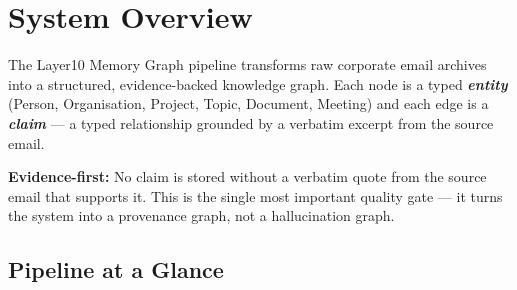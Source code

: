 \documentclass[11pt,a4paper]{article}
\newcommand{\term}[1]{\textbf{\textit{#1}}}
\begin{document}
\tableofcontents
\newpage

\section{System Overview}

The Layer10 Memory Graph pipeline transforms raw corporate email archives into a
structured, evidence-backed knowledge graph.  Each node is a typed \term{entity}
(Person, Organisation, Project, Topic, Document, Meeting) and each edge is a
\term{claim} — a typed relationship grounded by a verbatim excerpt from the
source email.

\begin{tcolorbox}[boxstyle, title={\faLightbulb\quad Core Design Principle}]
\textbf{Evidence-first:} No claim is stored without a verbatim quote from the
source email that supports it.  This is the single most important quality gate —
it turns the system into a provenance graph, not a hallucination graph.
\end{tcolorbox}

\subsection*{Pipeline at a Glance}
\end{document}

